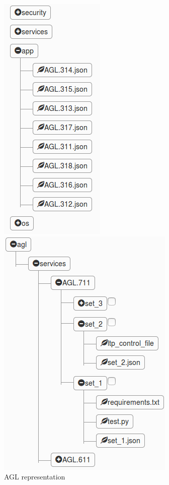  
\begin{figure}[htb!]
	\begin{minipage}{0.48\textwidth} \centering
	\includegraphics[width=0.5\linewidth]{images/agl_spec.png}
	\caption{AGL representation}
    \end{minipage} \hfill
    \begin{minipage}{0.48\textwidth} \centering
	\includegraphics[width=0.82\linewidth]{images/test_suite.png}

\end{minipage}
\end{figure}
